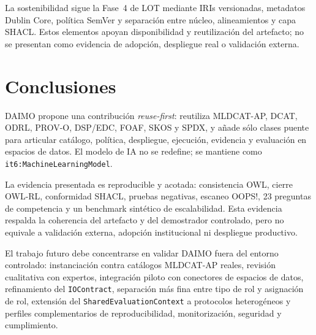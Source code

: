 \documentclass[Afour,sagev,times]{sagej}
\newcommand{\code}[1]{\texttt{#1}}
\begin{document}
La sostenibilidad sigue la Fase~4 de LOT mediante IRIs versionadas, metadatos Dublin Core, política SemVer y separación entre núcleo, alineamientos y capa SHACL. Estos elementos apoyan disponibilidad y reutilización del artefacto; no se presentan como evidencia de adopción, despliegue real o validación externa.

\section{Conclusiones}\label{sec:conclusion}

DAIMO propone una contribución \emph{reuse-first}: reutiliza MLDCAT-AP, DCAT, ODRL, PROV-O, DSP/EDC, FOAF, SKOS y SPDX, y añade sólo clases puente para articular catálogo, política, despliegue, ejecución, evidencia y evaluación en espacios de datos. El modelo de IA no se redefine; se mantiene como \code{it6:MachineLearningModel}.

La evidencia presentada es reproducible y acotada: consistencia OWL, cierre OWL-RL, conformidad SHACL, pruebas negativas, escaneo OOPS!, 23 preguntas de competencia y un benchmark sintético de escalabilidad. Esta evidencia respalda la coherencia del artefacto y del demostrador controlado, pero no equivale a validación externa, adopción institucional ni despliegue productivo.

El trabajo futuro debe concentrarse en validar DAIMO fuera del entorno controlado: instanciación contra catálogos MLDCAT-AP reales, revisión cualitativa con expertos, integración piloto con conectores de espacios de datos, refinamiento del \code{IOContract}, separación más fina entre tipo de rol y asignación de rol, extensión del \code{SharedEvaluationContext} a protocolos heterogéneos y perfiles complementarios de reproducibilidad, monitorización, seguridad y cumplimiento.
\end{document}
